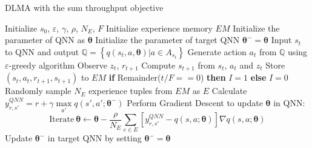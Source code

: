 \documentclass[journal,comsoc]{IEEEtran}
\begin{document}
\begin{algorithm}
	\caption{DLMA with the sum throughput objective}\label{alg:DLMA1}
	\begin{algorithmic}
		\State Initialize $ s_0 $, $ \varepsilon $, $ \gamma $, $ \rho $,  $ N_E $, $ F $
		\State Initialize experience memory $ EM $
		\State Initialize the parameter of QNN as $  \bm{\theta } $ 
		\State Initialize the parameter of target QNN  $ \bm{\theta^- }=\bm{\theta } $ 
		\State Input $ s_t $ to QNN and output $\mathbb{Q} = \left\{ {q\left( {s_t,a,{\bm{\theta}}} \right)|a \in {A_{s_t}}} \right\}$
		\State Generate action $ a_t $ from $ \mathbb{Q} $ using $ \varepsilon $-greedy algorithm
		\State Observe $ z_t $, $ r_{t+1} $ 
		\State Compute $ s_{t+1} $ from $ s_t $, $ a_t $ and $ z_t $
		\State Store $ \left( {s_t, a_t, r_{t+1}, s_{t+1}} \right) $ to $ EM $
		\State \textbf{if} Remainder($ t/F==0 $) \textbf{then}  $ I=1 $ \textbf{else} $ I=0 $
		\State {}\footnotemark
		\EndFor \\
		\State Randomly sample $ N_E $ experience tuples from $ EM $ as $ E $
		\State Calculate $ y_{r,s'}^{QNN} = r + \gamma \mathop {\max }\limits_{a'} q\left( {s',a';{\bm{\theta^- }}} \right) $
		\EndFor 
		\State Perform Gradient Descent to update  $ \bm{\theta } $ in QNN:
		\begin{equation*}
		\text{Iterate} \ {\bm{\theta }} \leftarrow {\bm{\theta }} - \frac{\rho }{{{N_E}}}\sum\limits_{e \in E} {\left[ {y_{r,s'}^{QNN} - q\left( {s,a;{\bm{\theta }}} \right)} \right]\nabla q\left( {s,a;{\bm{\theta }}} \right)}
		\end{equation*}
		\State Update $ \bm{\theta^- } $ in target QNN by setting $ \bm{\theta^-} = \bm{\theta } $
		\EndIf
		\EndProcedure
	\end{algorithmic}
\end{algorithm}
\end{document}
